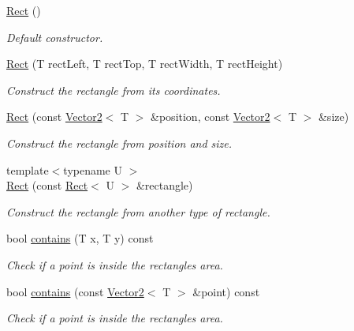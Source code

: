 \begin{DoxyCompactItemize}
\item 
\hyperlink{classsf_1_1_rect_a0f87ebaef9722a6222fd2e04ce8efb37}{Rect} ()
\begin{DoxyCompactList}\small\item\em Default constructor. \end{DoxyCompactList}\item 
\hyperlink{classsf_1_1_rect_a15cdbc5a1aed3a8fc7be1bd5004f19f9}{Rect} (T rect\+Left, T rect\+Top, T rect\+Width, T rect\+Height)
\begin{DoxyCompactList}\small\item\em Construct the rectangle from its coordinates. \end{DoxyCompactList}\item 
\hyperlink{classsf_1_1_rect_a27fdf85caa6d12caeeff78913cc59936}{Rect} (const \hyperlink{classsf_1_1_vector2}{Vector2}$<$ T $>$ \&position, const \hyperlink{classsf_1_1_vector2}{Vector2}$<$ T $>$ \&size)
\begin{DoxyCompactList}\small\item\em Construct the rectangle from position and size. \end{DoxyCompactList}\item 
{\footnotesize template$<$typename U $>$ }\\\hyperlink{classsf_1_1_rect_a6fff2bb7e93677839461a66bc2957de0}{Rect} (const \hyperlink{classsf_1_1_rect}{Rect}$<$ U $>$ \&rectangle)
\begin{DoxyCompactList}\small\item\em Construct the rectangle from another type of rectangle. \end{DoxyCompactList}\item 
bool \hyperlink{classsf_1_1_rect_a1d8a4a3aecec18310f6e3e23db43dfb8}{contains} (T x, T y) const
\begin{DoxyCompactList}\small\item\em Check if a point is inside the rectangle\textquotesingle{}s area. \end{DoxyCompactList}\item 
bool \hyperlink{classsf_1_1_rect_aa254e12d95ecf460ace8b2784fbab5eb}{contains} (const \hyperlink{classsf_1_1_vector2}{Vector2}$<$ T $>$ \&point) const
\begin{DoxyCompactList}\small\item\em Check if a point is inside the rectangle\textquotesingle{}s area. \end{DoxyCompactList}\item 

\end{DoxyCompactItemize}
